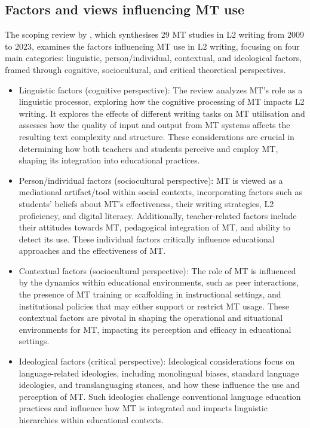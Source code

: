 \documentclass[output=paper]{langscibook}
\begin{document}
\subsection{Factors and views influencing MT use}

The scoping review by \citet{jiangetal24}, which synthesises 29 MT studies in L2 writing from 2009 to 2023, examines the factors influencing MT use in L2 writing, focusing on four main categories: linguistic, person/individual, contextual, and ideological factors, framed through cognitive, sociocultural, and critical theoretical perspectives.

\begin{itemize}
\item Linguistic factors (cognitive perspective): The review analyzes MT’s role as a linguistic processor, exploring how the cognitive processing of MT impacts L2 writing. It explores the effects of different writing tasks on MT utilisation and assesses how the quality of input and output from MT systems affects the resulting text complexity and structure. These considerations are crucial in determining how both teachers and students perceive and employ MT, shaping its integration into educational practices.
\item Person/individual factors (sociocultural perspective): MT is viewed as a mediational artifact/tool within social contexts, incorporating factors such as students’ beliefs about MT’s effectiveness, their writing strategies, L2 proficiency, and digital literacy. Additionally, teacher-related factors include their attitudes towards MT, pedagogical integration of MT, and ability to detect its use. These individual factors critically influence educational approaches and the effectiveness of MT.
\item Contextual factors (sociocultural perspective): The role of MT is influenced by the dynamics within educational environments, such as peer interactions, the presence of MT training or scaffolding in instructional settings, and institutional policies that may either support or restrict MT usage. These contextual factors are pivotal in shaping the operational and situational environments for MT, impacting its perception and efficacy in educational settings.
\item Ideological factors (critical perspective): Ideological considerations focus on language-related ideologies, including monolingual biases, standard language ideologies, and translanguaging stances, and how these influence the use and perception of MT. Such ideologies challenge conventional language education practices and influence how MT is integrated and impacts linguistic hierarchies within educational contexts.
\end{itemize}
\end{document}
